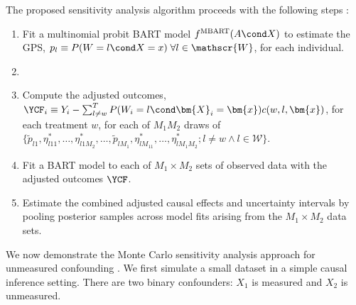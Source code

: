 The proposed sensitivity analysis algorithm  proceeds with the following steps \citep{hu2022flexible}: 
\begin{enumerate}
    \item Fit a multinomial probit BART model \citep{kindo2016multinomial} $f^{\text{MBART}}(A\cond X)$ to estimate the GPS, $p_l \equiv P (W = l \cond X =x) \;  \forall l \in \mathscr{W}$, for each individual. 
    \item 
\begin{algorithmic}
    \EndFor
    \EndFor
\end{algorithmic}
\item Compute the adjusted outcomes, $\YCF_i \equiv Y_i - \sum_{l \neq w}^T P(W_i = l\cond \bm{X}_i= \bm{x}) c(w, l,\bm{x})$,  for each treatment $w$,  for each of $M_1M_2$ draws of $\{\tilde{p}_{l1},  \eta^*_{l11}, \ldots, \eta^*_{l1M_2}, \ldots,  \tilde{p}_{lM_1},  \eta^*_{lM_11}, \ldots,  \eta^*_{lM_1M_2};  l \neq w \wedge l \in \mathscr{W}\}$. 
\item Fit a BART model to each of $M_1\times M_2$ sets of observed data with  the adjusted outcomes $\YCF$. 
\item Estimate the combined adjusted causal effects and uncertainty intervals by pooling posterior samples across model fits arising from the $M_1 \times M_2$ data sets.    
\end{enumerate}

We now demonstrate the Monte Carlo sensitivity analysis approach for unmeasured confounding \citep{hu2022flexible}. We first simulate a small dataset in a simple causal inference setting. There are two binary confounders: $X_1$ is measured and $X_2$ is unmeasured. 


